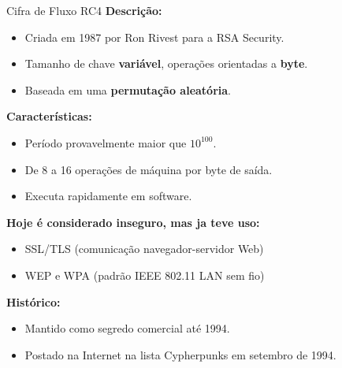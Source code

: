 \begin{frame}{Cifra de Fluxo RC4}
    \textbf{Descrição:}
    \begin{itemize}
        \item Criada em 1987 por Ron Rivest para a RSA Security.
        \item Tamanho de chave \textbf{variável}, operações orientadas a \textbf{byte}.
        \item Baseada em uma \textbf{permutação aleatória}.
    \end{itemize}

    \textbf{Características:}
    \begin{itemize}
        \item Período provavelmente maior que $10^{100}$.
        \item De 8 a 16 operações de máquina por byte de saída.
        \item Executa rapidamente em software.
    \end{itemize}

    \textbf{Hoje é considerado inseguro, mas ja teve uso:}
    \begin{itemize}
        \item SSL/TLS (comunicação navegador-servidor Web)
        \item WEP e WPA (padrão IEEE 802.11 LAN sem fio)
    \end{itemize}

    \textbf{Histórico:}
    \begin{itemize}
        \item Mantido como segredo comercial até 1994.
        \item Postado na Internet na lista Cypherpunks em setembro de 1994.
    \end{itemize}
\end{frame}


